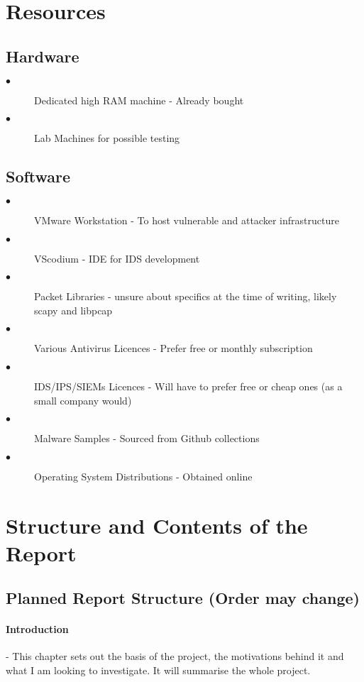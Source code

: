 \section{Resources}
\subsection{Hardware}
\begin{description}
	\item[$\bullet$] Dedicated high RAM machine - Already bought
	\item[$\bullet$] Lab Machines for possible testing
\end{description}

\subsection{Software}
\begin{description}
	\item[$\bullet$] VMware Workstation - To host vulnerable and attacker infrastructure
	\item[$\bullet$] VScodium - IDE for IDS development
	\item[$\bullet$] Packet Libraries - unsure about specifics at the time of writing, likely scapy and libpcap
	\item[$\bullet$] Various Antivirus Licences - Prefer free or monthly subscription
	\item[$\bullet$] IDS/IPS/SIEMs Licences - Will have to prefer free or cheap ones (as a small company would)
	\item[$\bullet$] Malware Samples - Sourced from Github collections
	\item[$\bullet$] Operating System Distributions - Obtained online 
\end{description}

\section{Structure and Contents of the Report}
\subsection{Planned Report Structure (Order may change)}


\paragraph{Introduction} - This chapter sets out the basis of the project, the motivations behind it and what I am looking to investigate. 
It will summarise the whole project.

